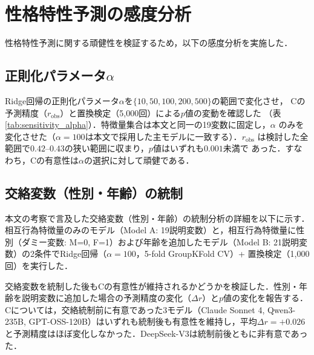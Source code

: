 \documentclass[dvipdfmx,11pt,a4paper]{bxjsarticle}
\renewcommand{\_}{\paperorigunderscore\allowbreak}%
\begin{document}
\section{性格特性予測の感度分析}
\label{sec:appendix_sensitivity}

性格特性予測に関する頑健性を検証するため，以下の感度分析を実施した．

\subsection{正則化パラメータ$\alpha$}
Ridge回帰の正則化パラメータ$\alpha$を$\{10, 50, 100, 200, 500\}$の範囲で変化させ，
Cの予測精度（$r_{\text{obs}}$）と置換検定（5,000回）による$p$値の変動を確認した
（表\ref{tab:sensitivity_alpha}）．特徴量集合は本文と同一の19変数に固定し，$\alpha$
のみを変化させた（$\alpha = 100$は本文で採用した主モデルに一致する）．$r_{\text{obs}}$
は検討した全範囲で$0.42$--$0.43$の狭い範囲に収まり，$p$値はいずれも$0.001$未満で
あった．すなわち，Cの有意性は$\alpha$の選択に対して頑健である．

\begin{table}[htbp]
\centering
\caption{正則化パラメータ$\alpha$に対する感度（Big5次元C，4モデル平均，
5-fold CV，置換検定5,000回）．$^{\dagger}$は本文で採用した$\alpha = 100$を表す．
$\alpha = 100$の$r_{\text{obs}} = 0.4315$は本文の3桁表記$0.432$に対応する．}
\label{tab:sensitivity_alpha}

\end{table}

\subsection{交絡変数（性別・年齢）の統制}
\label{sec:appendix_confound}

本文の考察で言及した交絡変数（性別・年齢）の統制分析の詳細を以下に示す．相互行為特徴量のみのモデル（Model A: 19説明変数）と，相互行為特徴量に性別（ダミー変数: M=0, F=1）および年齢を追加したモデル（Model B: 21説明変数）の2条件でRidge回帰（$\alpha = 100$，5-fold GroupKFold CV）+ 置換検定（1,000回）を実行した．

交絡変数を統制した後もCの有意性が維持されるかどうかを検証した．性別・年齢を説明変数に追加した場合の予測精度の変化（$\Delta r$）と$p$値の変化を報告する．Cについては，交絡統制前に有意であった3モデル（Claude Sonnet 4, Qwen3-235B, GPT-OSS-120B）はいずれも統制後も有意性を維持し，平均$\Delta r = +0.026$と予測精度はほぼ変化しなかった．DeepSeek-V3は統制前後ともに非有意であった．
\end{document}
